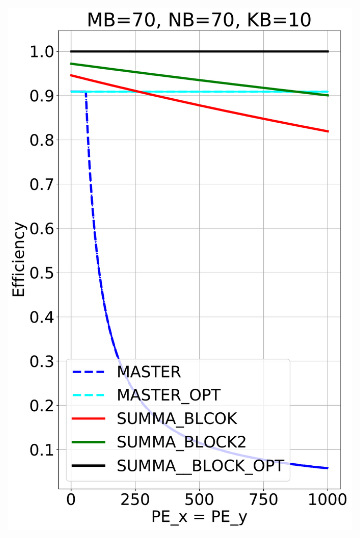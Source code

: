 \begin{figure}[t!]
\begin{subfigure}{0.32\columnwidth}
    \includegraphics[width=\linewidth]{figures/efficiency_cost_block_70_70_10.pdf}
  \end{subfigure}
  \hfill
  \begin{subfigure}{0.32\columnwidth}

\end{subfigure}
\end{figure}
